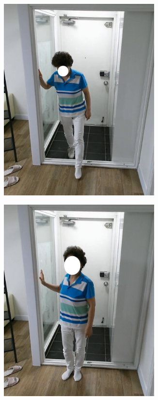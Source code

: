 \documentclass[thesis]{mas_proposal}
\begin{document}
\begin{figure}[htb!]
\begin{subfigure}[b]{0.22\textwidth}
		\subcaption{}%
		\label{subfig:seq2}
	\end{subfigure}
	\begin{subfigure}[b]{0.22\textwidth}
		\centering
		\includegraphics[width=0.9\textwidth]{images/dataset/3.png}
		\subcaption{}%
		\label{subfig:seq3}
	\end{subfigure}
	\begin{subfigure}[b]{0.22\textwidth}
		\centering
		\includegraphics[width=0.9\textwidth]{images/dataset/4.png}

\end{subfigure}
\end{figure}
\end{document}

